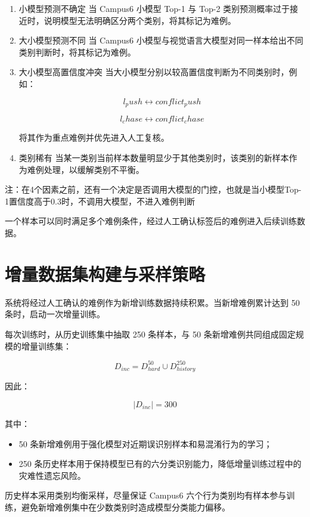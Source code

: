 \begin{enumerate}
\item 小模型预测不确定
当 Campus6 小模型 Top-1 与 Top-2 类别预测概率过于接近时，说明模型无法明确区分两个类别，将其标记为难例。

\item 大小模型预测不同
当 Campus6 小模型与视觉语言大模型对同一样本给出不同类别判断时，将其标记为难例。

\item 大小模型高置信度冲突
当大小模型分别以较高置信度判断为不同类别时，例如：

\[
l_push \leftrightarrow  conflict_push
\]

\[
l_chase \leftrightarrow  conflict_chase
\]

将其作为重点难例并优先进入人工复核。

\item 类别稀有
当某一类别当前样本数量明显少于其他类别时，该类别的新样本作为难例处理，以缓解类别不平衡。

\end{enumerate}

注：在4个因素之前，还有一个决定是否调用大模型的门控，也就是当小模型Top-1置信度高于0.3时，不调用大模型，不进入难例判断

一个样本可以同时满足多个难例条件，经过人工确认标签后的难例进入后续训练数据。

\section{增量数据集构建与采样策略}

系统将经过人工确认的难例作为新增训练数据持续积累。当新增难例累计达到 50 条时，启动一次增量训练。

每次训练时，从历史训练集中抽取 250 条样本，与 50 条新增难例共同组成固定规模的增量训练集：

\[
D_{inc}=D_{hard}^{50}\cup D_{history}^{250}
\]

因此：

\[
|D_{inc}|=300
\]

其中：

\begin{itemize}
\item 50 条新增难例用于强化模型对近期误识别样本和易混淆行为的学习；
\item 250 条历史样本用于保持模型已有的六分类识别能力，降低增量训练过程中的灾难性遗忘风险。
\end{itemize}

历史样本采用类别均衡采样，尽量保证 Campus6 六个行为类别均有样本参与训练，避免新增难例集中在少数类别时造成模型分类能力偏移。


